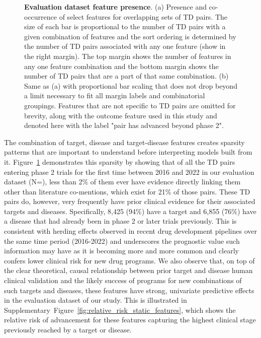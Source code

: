 \documentclass{article}
\begin{document}
\begin{figure}[!htb]
  \centering
  \captionsetup{width=.9\linewidth}
  \captionsetup[subfigure]{labelformat=empty}
  \qquad
  \caption{
    \textbf{Evaluation dataset feature presence}.
    (a) Presence and co-occurrence of select features for overlapping sets of TD pairs. The size of each bar is proportional to the number of TD pairs with a given combination of features and the sort ordering is determined by the number of TD pairs associated with any one feature (show in the right margin). The top margin shows the number of features in any one feature combination and the bottom margin shows the number of TD pairs that are a part of that same combination.
    (b) Same as (a) with proportional bar scaling that does not drop beyond a limit necessary to fit all margin labels and combinatorial groupings. Features that are not specific to TD pairs are omitted for brevity, along with the outcome feature used in this study and denoted here with the label "pair has advanced beyond phase 2".
  }
  \label{fig:feature_presence}
\end{figure}

The combination of target, disease and target-disease features creates sparsity patterns that are important to understand before interpreting models built from it. Figure~\ref{fig:feature_presence} demonstrates this sparsity by showing that of all the TD pairs entering phase 2 trials for the first time between 2016 and 2022 in our evaluation dataset (N=\evaluationDatasetPairCount), less than 2\% of them ever have evidence directly linking them other than literature co-mentions, which exist for 21\% of those pairs. These TD pairs do, however, very frequently have prior clinical evidence for their associated targets and diseases. Specifically, 8,425 (94\%) have a target and 6,855 (76\%) have a disease that had already been in phase 2 or later trials previously. This is consistent with herding effects observed in recent drug development pipelines \cite{PMID:37117303} over the same time period (2016-2022) and underscores the prognostic value such information may have as it is becoming more and more common and clearly confers lower clinical risk for new drug programs. We also observe that, on top of the clear theoretical, causal relationship between prior target and disease human clinical validation and the likely success of programs for new combinations of such targets and diseases, these features have strong, univariate predictive effects in the evaluation dataset of our study. This is illustrated in Supplementary~Figure~\ref{fig:relative_risk_static_features}, which shows the relative risk of advancement for these features capturing the highest clinical stage previously reached by a target or disease.
\end{document}
